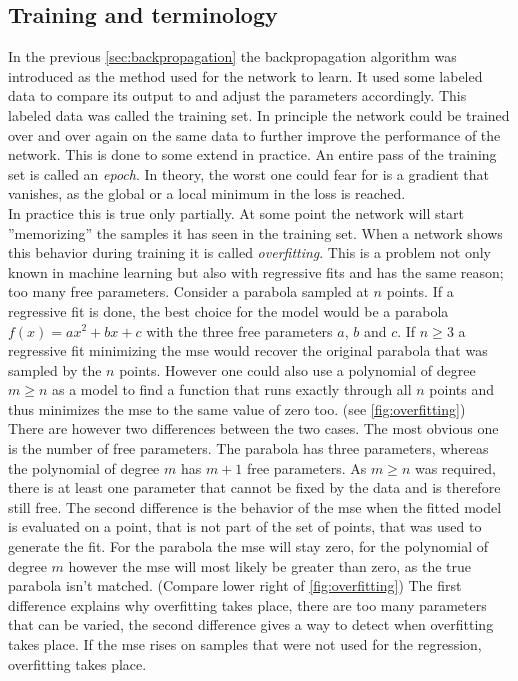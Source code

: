 \subsection{Training and terminology}\label{sec:training}
In the previous \autoref{sec:backpropagation} the backpropagation algorithm was introduced as the method used for the network to learn. It used some labeled data to compare its output to and adjust the parameters accordingly. This labeled data was called the training set. In principle the network could be trained over and over again on the same data to further improve the performance of the network. This is done to some extend in practice. An entire pass of the training set is called an \emph{epoch}. In theory, the worst one could fear for is a gradient that vanishes, as the global or a local minimum in the loss is reached.\\
In practice this is true only partially. At some point the network will start ''memorizing'' the samples it has seen in the training set. When a network shows this behavior during training it is called \emph{overfitting}. This is a problem not only known in machine learning but also with regressive fits and has the same reason; too many free parameters. Consider a parabola sampled at $n$ points. If a regressive fit is done, the best choice for the model would be a parabola $f(x)=a x^2+b x + c$ with the three free parameters $a$, $b$ and $c$. If $n\geq 3$ a regressive fit minimizing the \gls{mse} would recover the original parabola that was sampled by the $n$ points. However one could also use a polynomial of degree $m\geq n$ as a model to find a function that runs exactly through all $n$ points and thus minimizes the \gls{mse} to the same value of zero too. (see \autoref{fig:overfitting})\\
There are however two differences between the two cases. The most obvious one is the number of free parameters. The parabola has three parameters, whereas the polynomial of degree $m$ has $m+1$ free parameters. As $m\geq n$ was required, there is at least one parameter that cannot be fixed by the data and is therefore still free. The second difference is the behavior of the \gls{mse} when the fitted model is evaluated on a point, that is not part of the set of points, that was used to generate the fit. For the parabola the \gls{mse} will stay zero, for the polynomial of degree $m$ however the \gls{mse} will most likely be greater than zero, as the true parabola isn't matched. (Compare lower right of \autoref{fig:overfitting}) The first difference explains why overfitting takes place, there are too many parameters that can be varied, the second difference gives a way to detect when overfitting takes place. If the \gls{mse} rises on samples that were not used for the regression, overfitting takes place.\\
